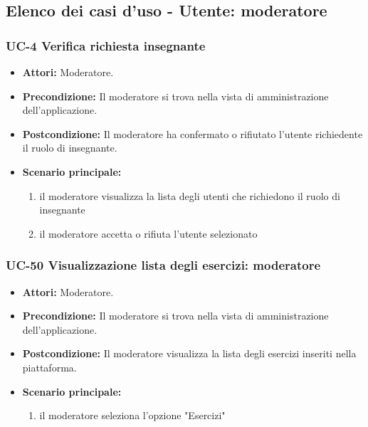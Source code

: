 \subsection{Elenco dei casi d'uso - Utente: moderatore}	
\subsubsection{UC-4 Verifica richiesta insegnante}
		\begin{itemize}
			\item \textbf{Attori:} Moderatore.
			\item \textbf{Precondizione:} Il moderatore si trova nella vista di amministrazione dell'applicazione.
			\item \textbf{Postcondizione:} Il moderatore ha confermato o rifiutato l'utente richiedente il ruolo di insegnante.
			\item \textbf{Scenario principale:}
				\begin{enumerate}
					\item il moderatore visualizza la lista degli utenti che richiedono il ruolo di insegnante
					\item il moderatore accetta o rifiuta l'utente selezionato
				\end{enumerate}
		\end{itemize}		
			
\subsubsection{UC-50 Visualizzazione lista degli esercizi: moderatore}
	\begin{itemize}
		\item \textbf{Attori:} Moderatore.
		\item \textbf{Precondizione:} Il moderatore si trova nella vista di amministrazione dell'applicazione.
		\item \textbf{Postcondizione:} Il moderatore visualizza la lista degli esercizi inseriti nella piattaforma.
		\item \textbf{Scenario principale:}
			\begin{enumerate}
				\item il moderatore seleziona l'opzione "Esercizi"
			\end{enumerate}
	\end{itemize}
		
